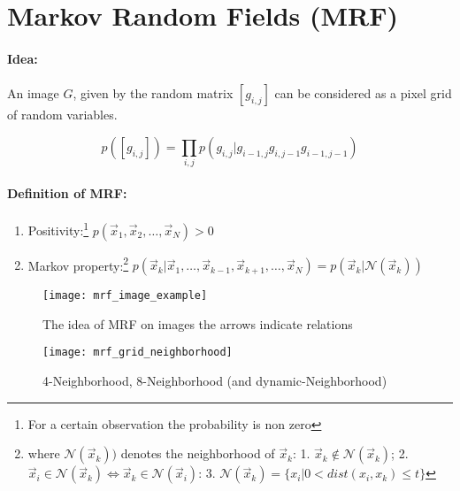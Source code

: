 
\section*{Markov Random Fields (MRF)}

\paragraph{Idea:} An image $G$, given by the random matrix $[g_{i,j}]$ can be considered as a pixel grid of random variables.


\begin{equation*}
    p([g_{i, j}]) = \prod_{i,j} p(g_{i, j} | g_{i-1, j} g_{i, j-1} g_{i-1, j-1})
\end{equation*}

\paragraph{Definition of MRF:}
\begin{enumerate}
    \item Positivity:\footnote{For a certain observation the probability is non zero} $ p(\vec{x}_1, \vec{x}_2, \dots, \vec{x}_N) > 0$
    \item Markov property:\footnote{where $\mathcal{N}(\vec{x}_k))$ denotes the neighborhood of $\vec{x}_k$: 1. $\vec{x}_k \notin \mathcal{N}(\vec{x}_k)$; 2. $\vec{x}_i \in \mathcal{N}(\vec{x}_k) \Leftrightarrow \vec{x}_k \in \mathcal{N}(\vec{x}_i)$: 3. $\mathcal{N}(\vec{x}_k) = \{x_i|0 < dist(x_i, x_k) \le t\}$} $ p(\vec{x}_k |\vec{x}_1, \dots, \vec{x}_{k-1}, \vec{x}_{k+1}, \dots, \vec{x}_N) = p(\vec{x}_k | \mathcal{N}(\vec{x}_k)) $
\end{enumerate}


\begin{figure}[H]
  \centering
  \begin{minipage}[b]{0.45\textwidth}
    \texttt{[image: mrf\_image\_example]}
		\caption{The idea of MRF on images the arrows indicate relations}
  \end{minipage}
  \begin{minipage}[b]{0.45\textwidth}
    \texttt{[image: mrf\_grid\_neighborhood]}
		\caption{4-Neighborhood, 8-Neighborhood (and dynamic-Neighborhood)}
  \end{minipage}
\end{figure}

